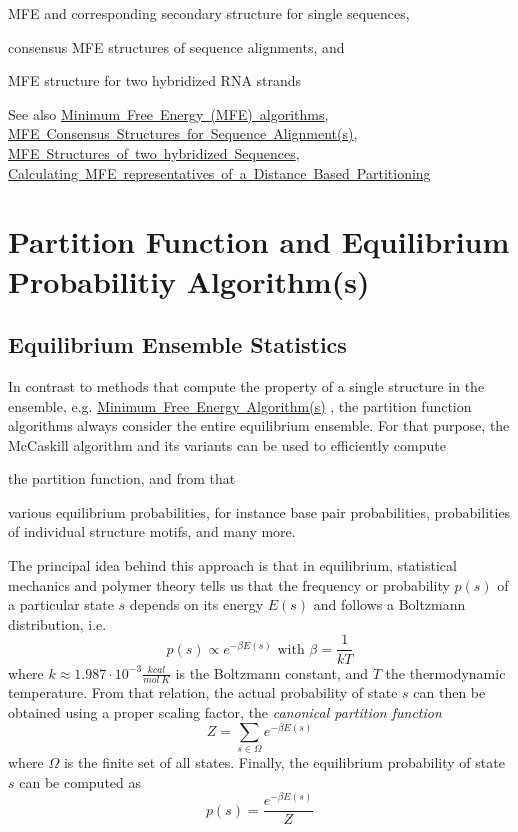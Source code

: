 \begin{DoxyItemize}
\item M\+FE and corresponding secondary structure for single sequences,
\item consensus M\+FE structures of sequence alignments, and
\item M\+FE structure for two hybridized R\+NA strands
\end{DoxyItemize}

\begin{DoxySeeAlso}{See also}
\mbox{\hyperlink{group__mfe__fold}{Minimum Free Energy (M\+FE) algorithms}}, \mbox{\hyperlink{group__consensus__mfe__fold}{M\+FE Consensus Structures for Sequence Alignment(s)}}, \mbox{\hyperlink{group__mfe__cofold}{M\+FE Structures of two hybridized Sequences}}, \mbox{\hyperlink{group__kl__neighborhood__mfe}{Calculating M\+FE representatives of a Distance Based Partitioning}}
\end{DoxySeeAlso}
 \hypertarget{pf_algorithm}{}\section{Partition Function and Equilibrium Probabilitiy Algorithm(s)}\label{pf_algorithm}
\hypertarget{pf_algorithm_sec_pf_intro}{}\subsection{Equilibrium Ensemble Statistics}\label{pf_algorithm_sec_pf_intro}
In contrast to methods that compute the property of a single structure in the ensemble, e.\+g. \mbox{\hyperlink{mfe_algorithm}{Minimum Free Energy Algorithm(s)}} , the partition function algorithms always consider the entire equilibrium ensemble. For that purpose, the Mc\+Caskill algorithm \cite{mccaskill:1990} and its variants can be used to efficiently compute


\begin{DoxyItemize}
\item the partition function, and from that
\item various equilibrium probabilities, for instance base pair probabilities, probabilities of individual structure motifs, and many more.
\end{DoxyItemize}

The principal idea behind this approach is that in equilibrium, statistical mechanics and polymer theory tells us that the frequency or probability $p(s)$ of a particular state $s$ depends on its energy $E(s)$ and follows a Boltzmann distribution, i.\+e. \[ p(s) \propto e^{-\beta E(s)} \text{ with } \beta = \frac{1}{kT} \] where $k \approx 1.987 \cdot 10^{-3} \frac{kcal}{mol~K}$ is the Boltzmann constant, and $T$ the thermodynamic temperature. From that relation, the actual probability of state $s$ can then be obtained using a proper scaling factor, the {\itshape canonical partition function} \[ Z = \sum_{s \in \Omega} e^{-\beta E(s)} \] where $\Omega$ is the finite set of all states. Finally, the equilibrium probability of state $s$ can be computed as \[ p(s) = \frac{e^{-\beta E(s)}}{Z} \]

